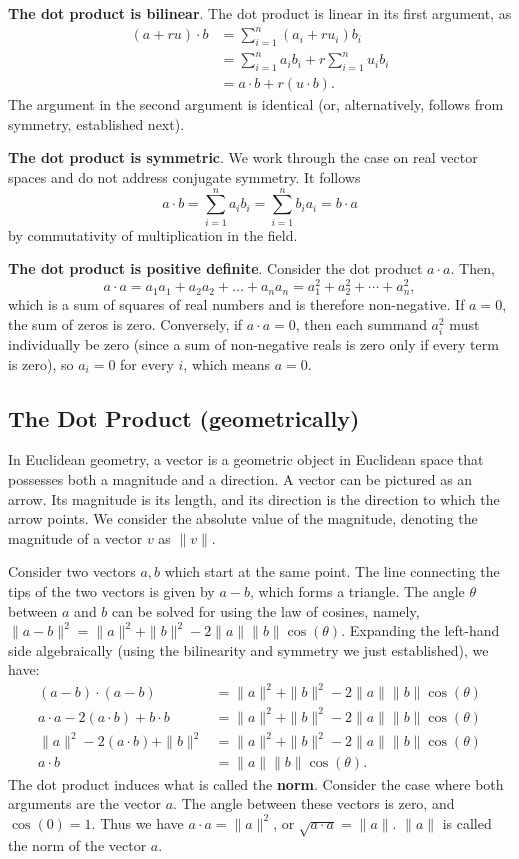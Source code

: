 \documentclass{article}
\begin{document}
\textbf{The dot product is bilinear}. The dot product is linear in its first argument, as
\begin{align*}
  (a + r u) \cdot b &= \sum_{i=1}^n (a_i + r u_i) b_i \\
  &= \sum_{i=1}^n a_i b_i + r \sum_{i=1}^n u_i b_i \\
  &= a \cdot b + r (u \cdot b).
\end{align*}
The argument in the second argument is identical (or, alternatively, follows from symmetry, established next).

\textbf{The dot product is symmetric}.
We work through the case on real vector spaces and do not address conjugate symmetry. It follows
$$a \cdot b = \sum_{i=1}^n a_i b_i = \sum_{i=1}^n b_i a_i = b \cdot a$$
by commutativity of multiplication in the field.

\textbf{The dot product is positive definite}. Consider the dot product $a \cdot a$. Then,
$$a \cdot a = a_1 a_1 + a_2 a_2 + \dots + a_n a_n = a_1^2 + a_2^2 + \cdots + a_n^2,$$
which is a sum of squares of real numbers and is therefore non-negative. If $a = 0$, the sum of zeros is zero. Conversely, if $a \cdot a = 0$, then each summand $a_i^2$ must individually be zero (since a sum of non-negative reals is zero only if every term is zero), so $a_i = 0$ for every $i$, which means $a = 0$.

\subsection{The Dot Product (geometrically)}

In Euclidean geometry, a vector is a geometric object in Euclidean space that possesses both a magnitude and a direction. A vector can be pictured as an arrow. Its magnitude is its length, and its direction is the direction to which the arrow points. We consider the absolute value of the magnitude, denoting the magnitude of a vector $v$ as $\|v\|$.

Consider two vectors $a, b$ which start at the same point. The line connecting the tips of the two vectors is given by $a - b$, which forms a triangle. The angle $\theta$ between $a$ and $b$ can be solved for using the law of cosines, namely, $\|a - b\|^2 = \|a\|^2 + \|b\|^2 - 2\|a\|\|b\| \cos(\theta)$. Expanding the left-hand side algebraically (using the bilinearity and symmetry we just established), we have:
\begin{align*}
    (a - b) \cdot (a - b) &= \|a\|^2 + \|b\|^2 - 2\|a\|\|b\| \cos(\theta) \\
    a \cdot a - 2(a \cdot b) + b \cdot b &= \|a\|^2 + \|b\|^2 - 2\|a\|\|b\| \cos(\theta) \\
    \|a\|^2 - 2(a \cdot b) + \|b\|^2 &= \|a\|^2 + \|b\|^2 - 2\|a\|\|b\| \cos(\theta) \\
    a \cdot b &= \|a\|\|b\| \cos(\theta).
\end{align*}
The dot product induces what is called the \textbf{norm}. Consider the case where both arguments are the vector $a$. The angle between these vectors is zero, and $\cos(0) = 1$. Thus we have $a \cdot a = \|a\|^2$, or $\sqrt{a \cdot a} = \|a\|$. $\|a\|$ is called the norm of the vector $a$.
\end{document}
